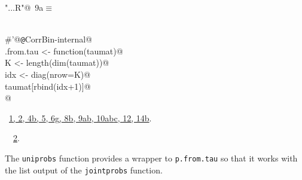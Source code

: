 \documentclass[reqno]{amsart}
\renewcommand{\NWtarget}[2]{\hypertarget{#1}{#2}}
\renewcommand{\NWlink}[2]{\hyperlink{#1}{#2}}
\begin{document}
\begin{flushleft} \small
\begin{minipage}{\linewidth}\label{scrap39}\raggedright\small
\NWtarget{nuweb9a}{} \verb@"..\R\ExchMultinomial.R"@\nobreak\ {\footnotesize {9a}}$\equiv$
\vspace{-1ex}
\begin{list}{}{} \item
\mbox{}\verb@@\\
\mbox{}\verb@#'@{\tt @}\verb@rdname CorrBin-internal@\\
\mbox{}\verb@p.from.tau <- function(taumat){@\\
\mbox{}\verb@  K <- length(dim(taumat))@\\
\mbox{}\verb@  idx <- diag(nrow=K)@\\
\mbox{}\verb@  taumat[rbind(idx+1)]@\\
\mbox{}\verb@}    @\\
\mbox{}\verb@@{\NWsep}
\end{list}
\vspace{-1.5ex}
\footnotesize
\begin{list}{}{\setlength{\itemsep}{-\parsep}\setlength{\itemindent}{-\leftmargin}}
\item \NWtxtFileDefBy\ \NWlink{nuweb1}{1}\NWlink{nuweb2}{, 2}\NWlink{nuweb4b}{, 4b}\NWlink{nuweb5}{, 5}\NWlink{nuweb6g}{, 6g}\NWlink{nuweb8b}{, 8b}\NWlink{nuweb9a}{, 9a}\NWlink{nuweb9b}{b}\NWlink{nuweb10a}{, 10a}\NWlink{nuweb10b}{b}\NWlink{nuweb10c}{c}\NWlink{nuweb12}{, 12}\NWlink{nuweb14b}{, 14b}.
\item \NWtxtIdentsUsed\nobreak\  \verb@tau@\nobreak\ \NWlink{nuweb2}{2}.
\item{}
\end{list}
\end{minipage}\vspace{4ex}
\end{flushleft}
The \texttt{uniprobs} function provides a wrapper to \texttt{p.from.tau} so that it works with the
list output of the \texttt{jointprobs} function.
\end{document}
